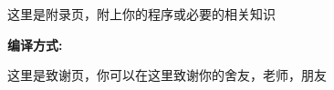 \documentclass[AutoFakeBold]{LZUThesis}
\begin{document}








\backmatter
\printbib

\Appendix

这里是附录页，附上你的程序或必要的相关知识

{\bfseries 编译方式:}

\Thanks

这里是致谢页，你可以在这里致谢你的舍友，老师，朋友

\Grade %
\end{document}
